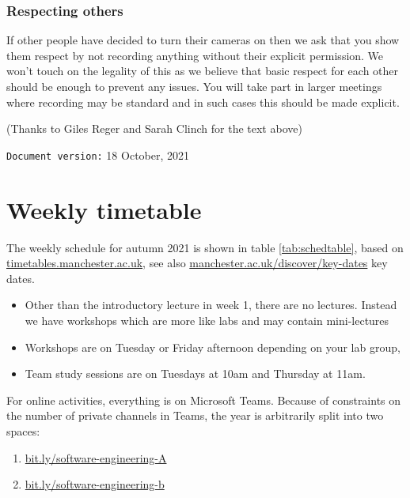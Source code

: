 \documentclass[
]{book}
\providecommand{\tightlist}{%
  \setlength{\itemsep}{0pt}\setlength{\parskip}{0pt}}
\begin{document}
\hypertarget{respecting}{%
\subsection{Respecting others}\label{respecting}}

If other people have decided to turn their cameras on then we ask that you show them respect by not recording anything without their explicit permission. We won't touch on the legality of this as we believe that basic respect for each other should be enough to prevent any issues. You will take part in larger meetings where recording may be standard and in such cases this should be made explicit.

(Thanks to Giles Reger and Sarah Clinch for the text above)

\texttt{Document\ version:} 18 October, 2021

\hypertarget{timetabling}{%
\chapter*{Weekly timetable}\label{timetabling}}

The weekly schedule for autumn 2021 is shown in table \ref{tab:schedtable}, based on \href{https://timetables.manchester.ac.uk/}{timetables.manchester.ac.uk}, see also \href{https://www.manchester.ac.uk/discover/key-dates/}{manchester.ac.uk/discover/key-dates} key dates.

\begin{itemize}
\tightlist
\item
  Other than the introductory lecture in week 1, there are no lectures. Instead we have workshops which are more like labs and may contain mini-lectures
\item
  Workshops are on Tuesday or Friday afternoon depending on your lab group,
\item
  Team study sessions are on Tuesdays at 10am and Thursday at 11am.
\end{itemize}

For online activities, everything is on Microsoft Teams. Because of constraints on the number of private channels in Teams, the year is arbitrarily split into two spaces:

\begin{enumerate}
\def\labelenumi{\arabic{enumi}.}
\tightlist
\item
  \href{https://bit.ly/software-engineering-A}{bit.ly/software-engineering-A}
\item
  \href{https://bit.ly/software-engineering-b}{bit.ly/software-engineering-b}
\end{enumerate}
\end{document}
